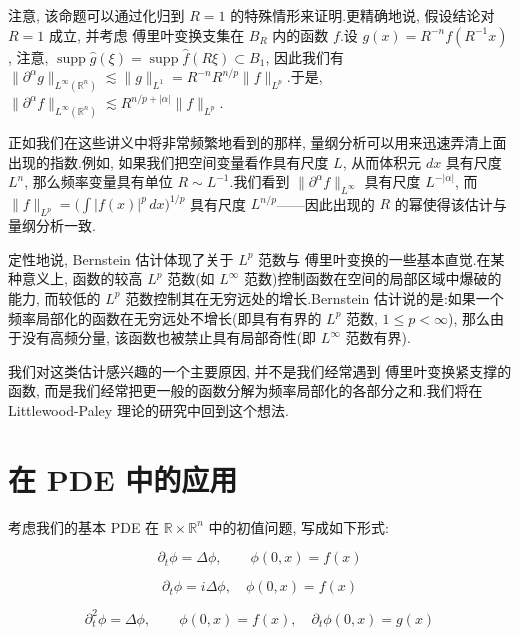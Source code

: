\begin{remark*}
注意, 该命题可以通过化归到 $R = 1$ 的特殊情形来证明.更精确地说, 假设结论对 $R = 1$ 成立, 并考虑 傅里叶变换支集在 $B_R$ 内的函数 $f$.设 $g(x) = R^{-n}f(R^{-1}x)$, 注意, $\operatorname{supp}\hat{g}(\xi) = \operatorname{supp}\hat{f}(R\xi)\subset B_1$, 因此我们有 $\|\partial^\alpha g\|_{L^\infty(\mathbb{R}^n)}\lesssim\|g\|_{L^1} = R^{-n}R^{n/p}\|f\|_{L^p}$.于是, $\|\partial^\alpha f\|_{L^\infty(\mathbb{R}^n)}\lesssim R^{n/p+|\alpha|}\|f\|_{L^p}$.
\end{remark*}

正如我们在这些讲义中将非常频繁地看到的那样, 量纲分析可以用来迅速弄清上面出现的指数.例如, 如果我们把空间变量看作具有尺度 $L$, 从而体积元 $dx$ 具有尺度 $L^n$, 那么频率变量具有单位 $R\sim L^{-1}$.我们看到 $\|\partial^\alpha f\|_{L^\infty}$ 具有尺度 $L^{-|\alpha|}$, 而 $\|f\|_{L^p} = \big(\int|f(x)|^p\, dx\big)^{1/p}$ 具有尺度 $L^{n/p}$——因此出现的 $R$ 的幂使得该估计与量纲分析一致.

定性地说, Bernstein 估计体现了关于 $L^p$ 范数与 傅里叶变换的一些基本直觉.在某种意义上, 函数的较高 $L^p$ 范数(如 $L^\infty$ 范数)控制函数在空间的局部区域中爆破的能力, 而较低的 $L^p$ 范数控制其在无穷远处的增长.Bernstein 估计说的是:如果一个频率局部化的函数在无穷远处不增长(即具有有界的 $L^p$ 范数, $1\leq p<\infty$), 那么由于没有高频分量, 该函数也被禁止具有局部奇性(即 $L^\infty$ 范数有界).

我们对这类估计感兴趣的一个主要原因, 并不是我们经常遇到 傅里叶变换紧支撑的函数, 而是我们经常把更一般的函数分解为频率局部化的各部分之和.我们将在 Littlewood-Paley 理论的研究中回到这个想法.


\section{在 PDE 中的应用}

考虑我们的基本 PDE 在 $\mathbb{R}\times\mathbb{R}^n$ 中的初值问题, 写成如下形式:

\begin{equation}
\partial_t\phi = \Delta\phi, \qquad \phi(0, x) = f(x)\label{eq:c5-171}
\end{equation}

\begin{equation}
\partial_t\phi = i\Delta\phi, \quad \phi(0, x) = f(x)\label{eq:c5-172}
\end{equation}

\begin{equation}
\partial_t^2\phi = \Delta\phi, \qquad \phi(0, x) = f(x), \quad \partial_t\phi(0, x) = g(x)\label{eq:c5-173}
\end{equation}

